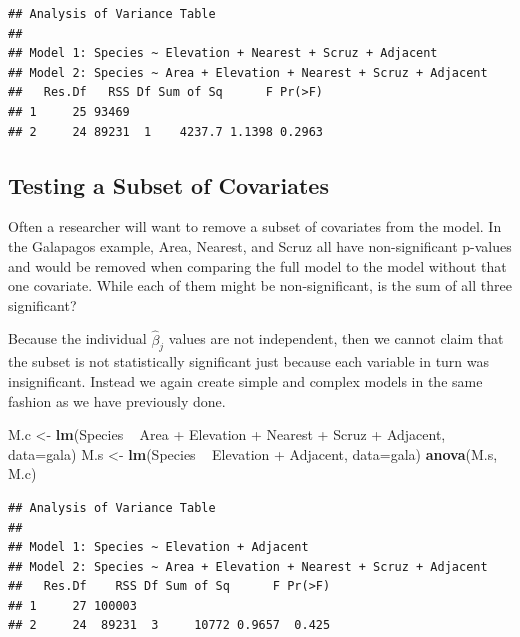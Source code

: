 \documentclass[]{book}
\newenvironment{Shaded}{\begin{snugshade}}{\end{snugshade}}
\newcommand{\KeywordTok}[1]{\textcolor[rgb]{0.13,0.29,0.53}{\textbf{{#1}}}}
\newcommand{\DataTypeTok}[1]{\textcolor[rgb]{0.13,0.29,0.53}{{#1}}}
\newcommand{\StringTok}[1]{\textcolor[rgb]{0.31,0.60,0.02}{{#1}}}
\newcommand{\NormalTok}[1]{{#1}}
\theoremstyle{definition}
\theoremstyle{definition}
\theoremstyle{remark}
\begin{document}
\begin{verbatim}
## Analysis of Variance Table
## 
## Model 1: Species ~ Elevation + Nearest + Scruz + Adjacent
## Model 2: Species ~ Area + Elevation + Nearest + Scruz + Adjacent
##   Res.Df   RSS Df Sum of Sq      F Pr(>F)
## 1     25 93469                           
## 2     24 89231  1    4237.7 1.1398 0.2963
\end{verbatim}

\subsection{Testing a Subset of
Covariates}\label{testing-a-subset-of-covariates}

Often a researcher will want to remove a subset of covariates from the
model. In the Galapagos example, Area, Nearest, and Scruz all have
non-significant p-values and would be removed when comparing the full
model to the model without that one covariate. While each of them might
be non-significant, is the sum of all three significant?

Because the individual \(\hat{\beta}_{j}\) values are not independent,
then we cannot claim that the subset is not statistically significant
just because each variable in turn was insignificant. Instead we again
create simple and complex models in the same fashion as we have
previously done.

\begin{Shaded}
\begin{Highlighting}[]
\NormalTok{M.c <-}\StringTok{ }\KeywordTok{lm}\NormalTok{(Species ~}\StringTok{ }\NormalTok{Area +}\StringTok{ }\NormalTok{Elevation +}\StringTok{ }\NormalTok{Nearest +}\StringTok{ }\NormalTok{Scruz +}\StringTok{ }\NormalTok{Adjacent, }\DataTypeTok{data=}\NormalTok{gala)}
\NormalTok{M.s <-}\StringTok{ }\KeywordTok{lm}\NormalTok{(Species ~}\StringTok{        }\NormalTok{Elevation +}\StringTok{                   }\NormalTok{Adjacent, }\DataTypeTok{data=}\NormalTok{gala)}
\KeywordTok{anova}\NormalTok{(M.s, M.c)}
\end{Highlighting}
\end{Shaded}

\begin{verbatim}
## Analysis of Variance Table
## 
## Model 1: Species ~ Elevation + Adjacent
## Model 2: Species ~ Area + Elevation + Nearest + Scruz + Adjacent
##   Res.Df    RSS Df Sum of Sq      F Pr(>F)
## 1     27 100003                           
## 2     24  89231  3     10772 0.9657  0.425
\end{verbatim}
\end{document}
